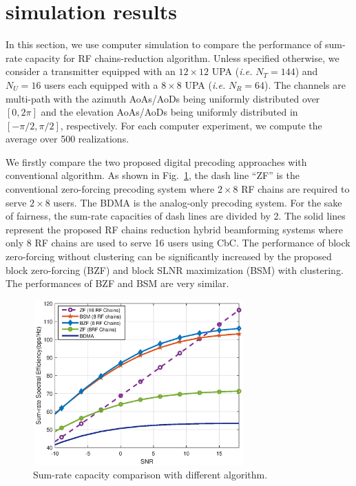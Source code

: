 \documentclass[conference]{IEEEtran}
\begin{document}
{\section{simulation results}
In this section, we use computer simulation to compare the performance of sum-rate capacity for RF chains-reduction algorithm. Unless specified otherwise, we consider a transmitter equipped with an $12\times 12$ UPA ({\em i.e.} $N_T=144$) and $N_U=16$ users each equipped with a $8\times 8$ UPA ({\em i.e.} $N_R=64$). The channels are multi-path with the azimuth AoAs/AoDs being uniformly distributed over $[0, 2\pi]$ and the elevation AoAs/AoDs being uniformly distributed in $[-\pi/2, \pi/2]$, respectively. For each computer experiment, we compute the average over 500 realizations.

We firstly compare the two proposed digital precoding approaches with conventional algorithm. As shown in Fig.~\ref{fig:MultiuserGain}, the dash line ``ZF'' is the conventional zero-forcing precoding system where $2\times 8$ RF chains are required to serve $2\times 8$ users.  The BDMA is the analog-only precoding system. For the sake of fairness, the sum-rate capacities of dash lines are divided by 2. The solid lines represent the proposed RF chains reduction hybrid beamforming systems where only 8 RF chains are used to serve 16 users using CbC. The performance of block zero-forcing without clustering can be significantly increased by the proposed block zero-forcing (BZF) and block SLNR maximization (BSM) with clustering. The performances of BZF and BSM are very similar.

\begin{figure}[ht]
	\begin{center}
		\includegraphics[width=3.2in,height=2.5in]{Figure/comp1path.eps}
		\caption{Sum-rate capacity comparison with different algorithm.}\label{fig:MultiuserGain}
	\end{center}
\end{figure}

}
\end{document}
